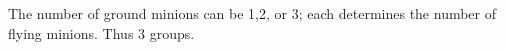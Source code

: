 The number of ground minions can be 1,2, or 3; each determines the number of flying minions. Thus $\boxed3$ groups.
